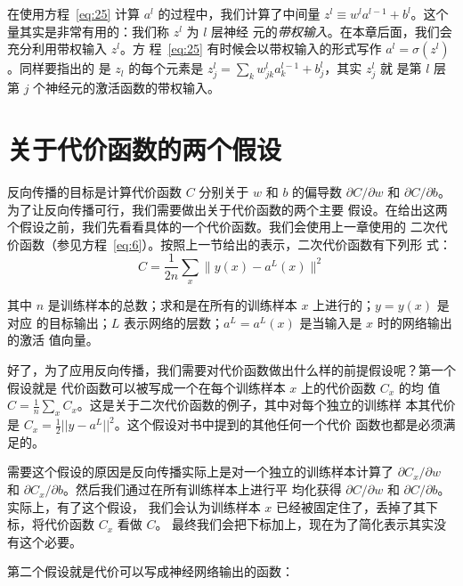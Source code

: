 在使用方程~\eqref{eq:25} 计算 $a^l$ 的过程中，我们计算了中间量
$z^l \equiv w^l a^{l-1}+b^l$。这个量其实是非常有用的：我们称 $z^l$ 为 $l$ 层神经
元的\emph{带权输入}。在本章后面，我们会充分利用带权输入 $z^l$。方
程~\eqref{eq:25} 有时候会以带权输入的形式写作 $a^l = \sigma(z^l)$。同样要指出的
是 $z_l$ 的每个元素是 $z^l_j = \sum_k w^l_{jk} a^{l-1}_k+b^l_j$，其实 $z^l_j$ 就
是第 $l$ 层第 $j$ 个神经元的激活函数的带权输入。

\section{关于代价函数的两个假设}
\label{sec:TwoAssumptionsWeNeedAboutTheCostFunction}

反向传播的目标是计算代价函数 $C$ 分别关于 $w$ 和 $b$ 的偏导数 $\partial
C/\partial w$ 和
$\partial C / \partial b$。为了让反向传播可行，我们需要做出关于代价函数的两个主要
假设。在给出这两个假设之前，我们先看看具体的一个代价函数。我们会使用上一章使用的
二次代价函数（参见方程~\eqref{eq:6}）。按照上一节给出的表示，二次代价函数有下列形
式：
\begin{equation}
  C = \frac{1}{2n} \sum_x \|y(x)-a^L(x)\|^2
  \label{eq:26}\tag{26}
\end{equation}

其中 $n$ 是训练样本的总数；求和是在所有的训练样本 $x$ 上进行的；$y = y(x)$ 是对应
的目标输出；$L$ 表示网络的层数；$a^L = a^L(x)$ 是当输入是 $x$ 时的网络输出的激活
值向量。

好了，为了应用反向传播，我们需要对代价函数做出什么样的前提假设呢？第一个假设就是
代价函数可以被写成一个在每个训练样本 $x$ 上的代价函数 $C_x$ 的均
值 $C=\frac{1}{n} \sum_x C_x$。这是关于二次代价函数的例子，其中对每个独立的训练样
本其代价是 $C_x = \frac{1}{2} ||y-a^L||^2$。这个假设对书中提到的其他任何一个代价
函数也都是必须满足的。

需要这个假设的原因是反向传播实际上是对一个独立的训练样本计算了 $\partial
C_x/\partial w$ 和 $\partial C_x/\partial b$。然后我们通过在所有训练样本上进行平
均化获得 $\partial C/\partial w$ 和 $\partial C/\partial b$。实际上，有了这个假设，
我们会认为训练样本 $x$ 已经被固定住了，丢掉了其下标，将代价函数 $C_x$ 看做 $C$。
最终我们会把下标加上，现在为了简化表示其实没有这个必要。

第二个假设就是代价可以写成神经网络输出的函数：

